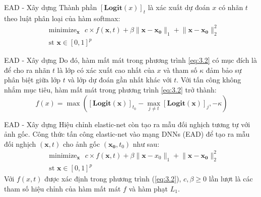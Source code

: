 \begin{frame}{EAD - Xây dựng}
    Thành phần $[\textbf{Logit}(x)]_t$ là xác xuất dự đoán $x$ có nhãn $t$ theo 
    luật phân loại của hàm softmax:
    \begin{equation}
        \begin{split}
        &\text{minimize}_{\mathbf{x}} \text{ }
        c \times f(\mathbf{x}, t) + \beta \lVert \mathbf{x} - \mathbf{x_0} \rVert_1
        + \lVert \mathbf{x} - \mathbf{x_0} \rVert_2^2 \\
        &\text{st   } \mathbf{x} \in [0,1]^p
        \end{split}
        \label{eq:7}
    \end{equation}
\end{frame}

\begin{frame}{EAD - Xây dựng}
    Do đó, hàm mất mát trong phương trình \ref{eq:3.2} có mục đích là để cho ra nhãn $t$ là 
    lớp có xác xuất cao nhất của $x$ và tham số $\kappa$ đảm bảo sự phân biệt giữa lớp $t$
    và lớp dự đoán gần nhất khác với $t$. Với tấn công không nhắm mục tiêu, hàm mất mát trong 
    phương trình \ref{eq:3.2} trở thành:
    \begin{equation}
        \label{eq:3.4}\
        f(x) = \max { \left([\textbf{Logit}(\mathbf{x})]_{t_0} - 
        \max_{j \neq t} [\textbf{Logit}(\mathbf{x})]_j, -\kappa \right) }
    \end{equation}
\end{frame}

\begin{frame}{EAD - Xây dựng}
    Hiệu chỉnh 
    elastic-net còn tạo ra mẫu đối nghịch tương tự với ảnh gốc. Công thức tấn công elastic-net
    vào mạng DNNs (EAD) để tạo ra mẫu đối nghịch $(\mathbf{x},t)$ cho ảnh gốc $(\mathbf{x_0}, t_0)$ như sau:
    \begin{equation}
        \label{eq:3.5}
        \begin{split}
        &\text{minimize}_{\mathbf{x}} \text{ }
        c \times f(\mathbf{x}, t) + \beta \lVert \mathbf{x} - x_0 \rVert_1
        + \lVert \mathbf{x} - \mathbf{x_0} \rVert_2^2 \\
        &\text{st   } \mathbf{x} \in [0,1]^p
        \end{split}
    \end{equation}
    Với $f(x,t)$ được xác định trong phương trình (\ref{eq:3.2}), $c, \beta \geq 0$ lần lượt 
    là các tham số  hiệu chỉnh của hàm mất mát $f$ và hàm phạt $L_1$.
\end{frame}

